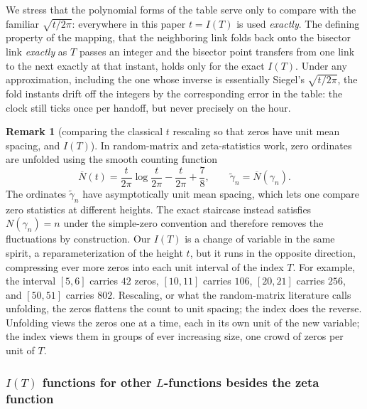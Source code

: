 \documentclass[11pt]{article}
\theoremstyle{definition}
\newtheorem{remark}[theorem]{Remark}
\begin{document}
We stress that the polynomial forms of the table serve only to compare
with the familiar $\sqrt{t/2\pi}$:
everywhere in this paper $t=I(T)$ is used \emph{exactly}. The defining
property of the mapping, that the neighboring link folds back onto the
bisector link \emph{exactly} as $T$ passes an integer and the bisector
point transfers from one link to the next exactly at that instant,
holds only for the exact $I(T)$. Under any approximation, including the one whose
inverse is essentially Siegel's $\sqrt{t/2\pi}$, the fold instants drift
off the integers by the corresponding error in the table: the clock
still ticks once per handoff, but never precisely on the hour.

\begin{remark}[comparing the classical $t$ rescaling so that zeros have unit
mean spacing, and $I(T)$]\label{rem:unfolding}
In random-matrix and zeta-statistics work, zero ordinates are unfolded using
the smooth counting function
\[
\overline N(t)=\frac{t}{2\pi}\log\frac{t}{2\pi}
-\frac{t}{2\pi}+\frac78,
\qquad
\widetilde\gamma_n=\overline N(\gamma_n).
\]
The ordinates $\widetilde\gamma_n$ have asymptotically unit mean spacing,
which lets one compare zero statistics at different heights. The exact
staircase instead satisfies $N(\gamma_n)=n$ under the simple-zero convention
and therefore removes the fluctuations by construction. Our $I(T)$ is a change of
variable in the same spirit, a reparameterization of the height $t$, but it
runs in the opposite direction, compressing ever more zeros into each unit
interval of the index $T$. For example, the interval $[5,6]$ carries $42$
zeros, $[10,11]$ carries $106$, $[20,21]$ carries $256$, and $[50,51]$ carries
$802$. Rescaling, or what the random-matrix literature calls unfolding, the
zeros flattens the count to unit spacing; the index does the reverse.
Unfolding views the zeros one at a time, each in its own unit of the new
variable; the index views them in groups of ever increasing size, one
crowd of zeros per unit of $T$.
\end{remark}

\subsubsection{\texorpdfstring{$I(T)$}{I(T)} functions for other \texorpdfstring{$L$}{L}-functions besides the zeta function}\label{sec:IT-Lfunctions}
\end{document}
